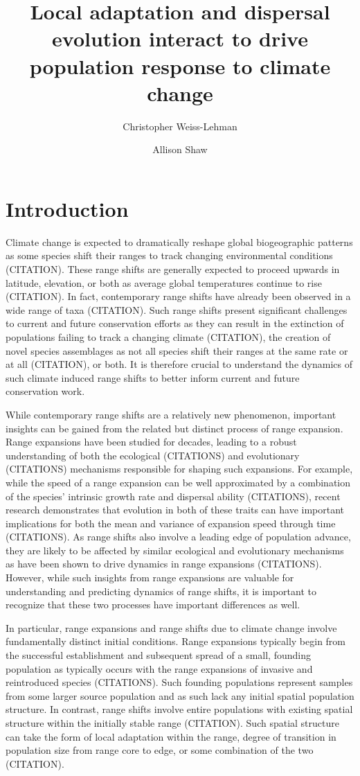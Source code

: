 \documentclass[11pt, oneside]{article}
\title{Local adaptation and dispersal evolution interact to drive population response to climate change}
\date{}
\author[1]{Christopher Weiss-Lehman}
\author[1]{Allison Shaw}
\affil[1]{Ecology, Evolution, and Behavior, University of Minnesota}
\begin{document}
\maketitle

\doublespacing
\linenumbers

\section{Introduction}
Climate change is expected to dramatically reshape global biogeographic patterns as some species shift their ranges to track changing environmental conditions (CITATION). These range shifts are generally expected to proceed upwards in latitude, elevation, or both as average global temperatures continue to rise (CITATION). In fact, contemporary range shifts have already been observed in a wide range of taxa (CITATION). Such range shifts present significant challenges to current and future conservation efforts as they can result in the extinction of populations failing to track a changing climate (CITATION), the creation of novel species assemblages as not all species shift their ranges at the same rate or at all (CITATION), or both. It is therefore crucial to understand the dynamics of such climate induced range shifts to better inform current and future conservation work.

While contemporary range shifts are a relatively new phenomenon, important insights can be gained from the related but distinct process of range expansion. Range expansions have been studied for decades, leading to a robust understanding of both the ecological (CITATIONS) and evolutionary (CITATIONS) mechanisms responsible for shaping such expansions. For example, while the speed of a range expansion can be well approximated by a combination of the species' intrinsic growth rate and dispersal ability (CITATIONS), recent research demonstrates that evolution in both of these traits can have important implications for both the mean and variance of expansion speed through time (CITATIONS). As range shifts also involve a leading edge of population advance, they are likely to be affected by similar ecological and evolutionary mechanisms as have been shown to drive dynamics in range expansions (CITATIONS). However, while such insights from range expansions are valuable for understanding and predicting dynamics of range shifts, it is important to recognize that these two processes have important differences as well.

In particular, range expansions and range shifts due to climate change involve fundamentally distinct initial conditions. Range expansions typically begin from the successful establishment and subsequent spread of a small, founding population as typically occurs with the range expansions of invasive and reintroduced species (CITATIONS). Such founding populations represent samples from some larger source population and as such lack any initial spatial population structure. In contrast, range shifts involve entire populations with existing spatial structure within the initially stable range (CITATION). Such spatial structure can take the form of local adaptation within the range, degree of transition in population size from range core to edge, or some combination of the two (CITATION). 
\end{document}
